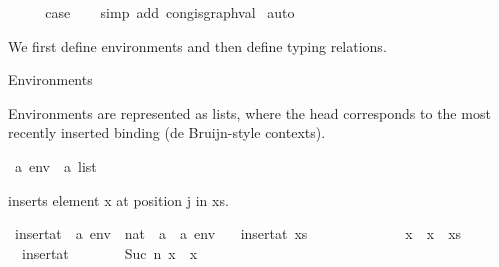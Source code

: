 \begin{isabellebody}
\ \ \isamarkupfalse%
\ \isamarkupfalse%
\ {\isacharquery}{\kern0pt}case\isanewline
\ \ \isamarkupfalse%
\ {\isacharparenleft}{\kern0pt}simp\ add{\isacharcolon}{\kern0pt}\ cong{\isacharunderscore}{\kern0pt}is{\isacharunderscore}{\kern0pt}graph{\isacharunderscore}{\kern0pt}val{\isacharparenright}{\kern0pt}\isanewline
{}\isamarkupfalse%
\ auto%
\endisatagproof
{\isafoldproof}%
%
\isadelimproof
%
\endisadelimproof
%
\isadelimdocument
%
\endisadelimdocument
%
\isatagdocument
%
\isamarkuptrue%
%
\endisatagdocument
{\isafolddocument}%
%
\isadelimdocument
%
\endisadelimdocument
%
\begin{isamarkuptext}%
We first define environments and then define typing relations.%
\end{isamarkuptext}\isamarkuptrue%
%
\begin{isamarkuptext}%
Environments%
\end{isamarkuptext}\isamarkuptrue%
%
\begin{isamarkuptext}%
Environments are represented as lists, where the head corresponds to the
  most recently inserted binding (de Bruijn-style contexts).%
\end{isamarkuptext}\isamarkuptrue%
\isamarkupfalse%
\ {\isacharparenleft}{\kern0pt}{\isacharprime}{\kern0pt}a{\isacharparenright}{\kern0pt}\ env\ {\isacharequal}{\kern0pt}\ {\isachardoublequoteopen}{\isacharprime}{\kern0pt}a\ list{\isachardoublequoteclose}%
\begin{isamarkuptext}%
 inserts element x at position j in xs.%
\end{isamarkuptext}\isamarkuptrue%
\isamarkupfalse%
\ insert{\isacharunderscore}{\kern0pt}at\ {\isacharcolon}{\kern0pt}{\isacharcolon}{\kern0pt}\ {\isachardoublequoteopen}{\isacharprime}{\kern0pt}a\ env\ {\isacharequal}{\kern0pt}{\isachargreater}{\kern0pt}\ nat\ {\isacharequal}{\kern0pt}{\isachargreater}{\kern0pt}\ {\isacharprime}{\kern0pt}a\ {\isacharequal}{\kern0pt}{\isachargreater}{\kern0pt}\ {\isacharprime}{\kern0pt}a\ env{\isachardoublequoteclose}\ \isanewline
\ \ {\isachardoublequoteopen}insert{\isacharunderscore}{\kern0pt}at\ xs\ \ \ \ \ \ \ {}\ \ \ \ \ \ \ x\ {\isacharequal}{\kern0pt}\ x\ {\isacharhash}{\kern0pt}\ xs{\isachardoublequoteclose}\ {\isacharbar}{\kern0pt}\isanewline
\ \ {\isachardoublequoteopen}insert{\isacharunderscore}{\kern0pt}at\ {\isacharbrackleft}{\kern0pt}{\isacharbrackright}{\kern0pt}\ \ \ \ \ \ \ {\isacharparenleft}{\kern0pt}Suc\ n{\isacharparenright}{\kern0pt}\ x\ {\isacharequal}{\kern0pt}\ {\isacharbrackleft}{\kern0pt}x{\isacharbrackright}{\kern0pt}{\isachardoublequoteclose}\ {\isacharbar}{\kern0pt}\isanewline

\end{isabellebody}
